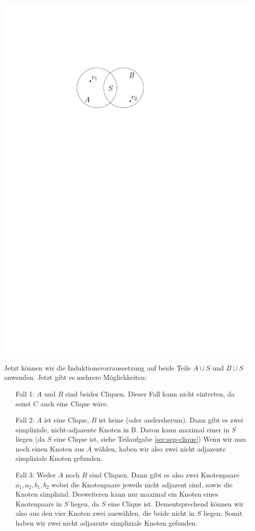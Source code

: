\begin{center}
    \vspace{1ex}
    \includegraphics[page=1]{fig/03-2b-sep}
\end{center}

Jetzt können wir die Induktionsvorraussetzung auf beide Teile $A \cup S$ und $B \cup S$ anwenden.
Jetzt gibt es mehrere Möglichkeiten:

\begin{itemize}
    \item [Fall 1:] $A$ und $B$ sind beides Cliquen. Dieser Fall kann nicht eintreten, da sonst $C$ auch eine Clique wäre.
    \item [Fall 2:] $A$ ist eine Clique, $B$ ist keine (oder andersherum). Dann gibt es zwei simpliziale, nicht-adjazente Knoten in B. Davon kann maximal einer in $S$ liegen (da $S$ eine Clique ist, siehe Teilaufgabe \ref{sec:sep-clique})
    Wenn wir nun noch einen Knoten aus $A$ wählen, haben wir also zwei nicht adjazente simpliziale Knoten gefunden.
    \item [Fall 3:] Weder $A$ noch $B$ sind Cliquen. Dann gibt es also zwei Knotenpaare $a_1, a_2, b_1, b_2$ wobei die Knotenpaare jeweils nicht adjazent sind, sowie die Knoten simplizial. Desweiteren kann nur maximal ein Knoten eines Knotenpaars in $S$ liegen, da $S$ eine Clique ist.
    Dementsprechend können wir also aus den vier Knoten zwei auswählen, die beide nicht in $S$ liegen. Somit haben wir zwei nicht adjazente simpliziale Knoten gefunden.
\end{itemize}

